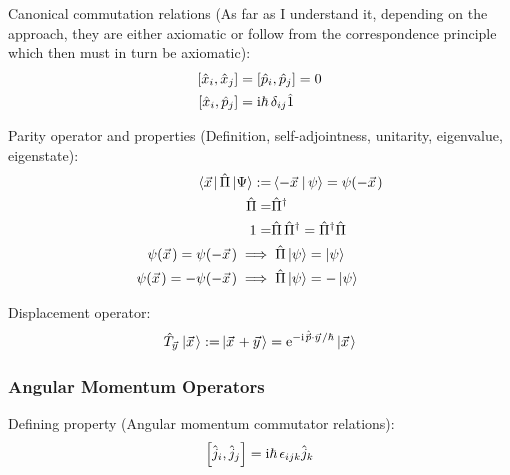 		\noindent
		Canonical commutation relations (As far as I understand it, depending on the approach, they are either axiomatic or follow from the correspondence principle which then must in turn be axiomatic):
		\begin{equation}
			\begin{aligned}
				\comm{\hat{x}_i}{\hat{x}_j } &= \comm{\hat{p}_i}{\hat{p}_j} = 0 \\
				\comm{\hat{x}_i}{\hat{p}_j } &= \i\hbar\, \delta_{ij}\hat{1} \\
			\end{aligned}
		\end{equation}

		\noindent
		Parity operator and properties (Definition, self-adjointness, unitarity, eigenvalue, eigenstate):
		\begin{equation}
			\begin{aligned}
				\Bra{\vec{x}} \hat{\Pi} \Ket{\Psi} :=& \Braket{-\vec{x} | \psi} = \psi(-\vec{x}) \\
				\hat{\Pi} =& \hat{\Pi}^\dagger\\
				1 =& \hat{\Pi} \,\hat{\Pi}^\dagger = \hat{\Pi}^\dagger \hat{\Pi} \\
				\psi(\vec{x}) = \psi(-\vec{x}) \implies&\; \hat{\Pi}\Ket{\psi} = \Ket{\psi} \\
				\psi(\vec{x}) = -\psi(-\vec{x}) \implies&\; \hat{\Pi}\Ket{\psi} = -\Ket{\psi} \\
			\end{aligned}
		\end{equation}

		\noindent
		Displacement operator:
		\begin{equation}
			\begin{aligned}
				\hat{T}_{\vec{y}}\Ket{\vec{x}} :=& \Ket{\vec{x} + \vec{y}} = \ex^{-\i\hat{\vec{p}}\cdot\vec{y}/\hbar}\Ket{\vec{x}} \\
			\end{aligned}
		\end{equation}

		\subsubsection{Angular Momentum Operators}
			\noindent
			Defining property (Angular momentum commutator relations):
			\begin{equation}
				\left[ \hat{j}_i, \hat{j}_j \right] = \mathrm{i}\hbar\, \epsilon_{ijk} \hat{j}_k
			\end{equation}

